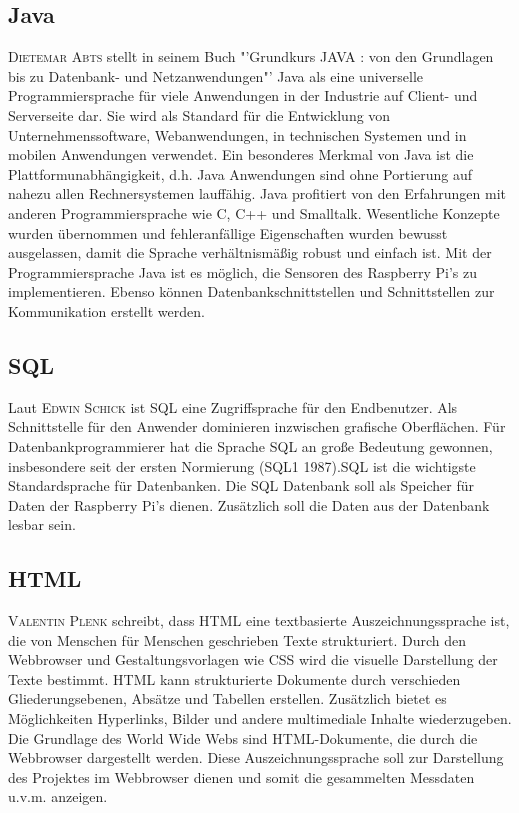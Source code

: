 \subsection{Java}\label{Java}
\textsc{Dietemar Abts} stellt in seinem Buch "'Grundkurs JAVA : von den Grundlagen bis zu Datenbank- und Netzanwendungen"' \cite{abts2015grundkurs} Java als eine universelle Programmiersprache für viele Anwendungen in der Industrie auf Client- und Serverseite dar.
Sie wird als Standard für die Entwicklung von Unternehmenssoftware, Webanwendungen, in technischen Systemen und in mobilen Anwendungen verwendet.
Ein besonderes Merkmal von Java ist die Plattformunabhängigkeit, d.h. Java Anwendungen sind ohne Portierung auf nahezu allen Rechnersystemen 
lauffähig. Java profitiert von den Erfahrungen mit anderen Programmiersprache wie C, C++ und Smalltalk. Wesentliche Konzepte wurden übernommen und fehleranfällige Eigenschaften wurden bewusst ausgelassen, damit die Sprache verhältnismäßig robust und einfach ist.%
Mit der Programmiersprache Java ist es möglich, die Sensoren des Raspberry Pi's zu implementieren. Ebenso können Datenbankschnittstellen und Schnittstellen zur Kommunikation erstellt werden.

\subsection{\ac{SQL}}
Laut \textsc{Edwin Schick}\cite{schicker2017datenbanken} ist \ac{SQL} eine Zugriffsprache für den Endbenutzer. Als Schnittstelle für den Anwender dominieren inzwischen grafische Oberflächen. Für Datenbankprogrammierer hat die Sprache \ac{SQL} an große Bedeutung gewonnen, insbesondere seit der ersten Normierung (SQL1 1987).\ac{SQL} ist die wichtigste Standardsprache für Datenbanken. Die \ac{SQL} Datenbank soll als Speicher für Daten der Raspberry Pi's dienen. Zusätzlich soll die Daten aus der Datenbank lesbar sein.
\subsection{\ac{HTML}}
\textsc{Valentin Plenk}\cite{plenk2017angewandte} schreibt, dass \ac{HTML} eine textbasierte Auszeichnungssprache ist, die von Menschen für Menschen geschrieben Texte strukturiert. Durch den Webbrowser und Gestaltungsvorlagen wie \ac{CSS} wird die visuelle Darstellung der Texte bestimmt. \ac{HTML} kann strukturierte Dokumente durch verschieden Gliederungsebenen, Absätze und Tabellen erstellen. Zusätzlich bietet es Möglichkeiten Hyperlinks, Bilder und andere multimediale Inhalte wiederzugeben. Die Grundlage des World Wide Webs sind \ac{HTML}-Dokumente, die durch die Webbrowser dargestellt werden. Diese Auszeichnungssprache soll zur Darstellung des Projektes im Webbrowser dienen und somit die gesammelten Messdaten u.v.m. anzeigen.

